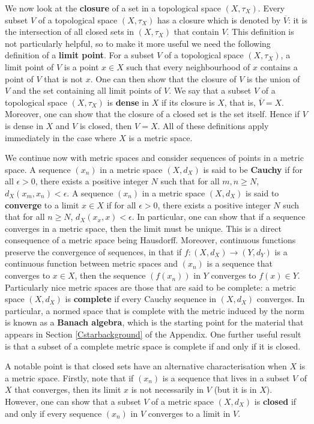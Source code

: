 \documentclass{article}
\theoremstyle{plain}
\theoremstyle{definition}
\theoremstyle{remark}
\begin{document}
We now look at the \textbf{closure} of a set in a topological space $(X, \tau_X)$.
Every subset $V$ of a topological space $(X, \tau_X)$ has a closure 
which is denoted by $\overline{V}$:
it is the intersection of all closed sets in $(X, \tau_X)$ that contain $V$.
This definition is not particularly helpful, so to make it more useful
we need the following definition of a \textbf{limit point}.
For a subset $V$ of a topological space $(X, \tau_X)$,
a limit point of $V$ is a point $x \in X$ such that
every neighbourhood of $x$ contains a point of $V$ that is not $x$.
One can then show that the closure of $V$ is the union of $V$ and
the set containing all limit points of $V$.
We say that a subset $V$ of a topological space $(X, \tau_X)$ is \textbf{dense} in $X$
if its closure is $X$, that is, $\overline{V} = X$.
Moreover, one can show that the 
closure of a closed set is the set itself.
Hence if $V$ is dense in $X$ and $V$ is closed, then $V = X$.
All of these definitions apply immediately in the case where $X$ is a metric space.

We continue now with metric spaces and consider sequences of points in a metric space.
A sequence $(x_n)$ in a metric space $(X,d_X)$ is said to be \textbf{Cauchy}
if for all $\epsilon > 0$, there exists a positive integer $N$ such that
for all $m, n \geq N$, $d_X(x_m, x_n) < \epsilon$.
A sequence $(x_n)$ in a metric space $(X,d_X)$ is said to \textbf{converge} 
to a limit $x \in X$
if for all $\epsilon > 0$, there exists a positive integer $N$ such that
for all $n \geq N$, $d_X(x_x, x) < \epsilon$. 
In particular, one can show that if a sequence converges in a metric space,
then the limit must be unique.
This is a direct consequence of a metric space
being Hausdorff.
Moreover, continuous functions preserve the convergence of sequences, in that if 
$f: (X,d_X) \rightarrow (Y,d_Y)$ is a continuous function between metric spaces 
and $(x_n)$ is a sequence
that converges to $x \in X$, then the sequence $(f(x_n))$ in $Y$ 
converges to $f(x) \in Y$.
Particularly nice metric spaces are those that are said to be complete:
a metric space $(X,d_X)$ is \textbf{complete} if every Cauchy sequence in $(X,d_X)$
converges.
In particular, a normed space that is complete with the metric induced by the norm
is known as a 
\textbf{Banach algebra}, which is the starting point for the material
that appears in Section \ref{Cstarbackground} of the Appendix.
One further useful result is that a subset of a 
complete metric space is complete if and only if it is closed.

A notable point is that closed sets
have an alternative characterisation when $X$ is a metric space.
Firstly, note that if $(x_n)$ is a sequence that lives in a subset
$V$ of $X$ that converges, then its limit $x$ is not necessarily in $V$ 
(but it is in $X$).
However, one can show that a subset $V$ of a metric space $(X,d_X)$ is \textbf{closed}
if and only if every sequence $(x_n)$ in $V$ converges to a limit in $V$.
\end{document}
